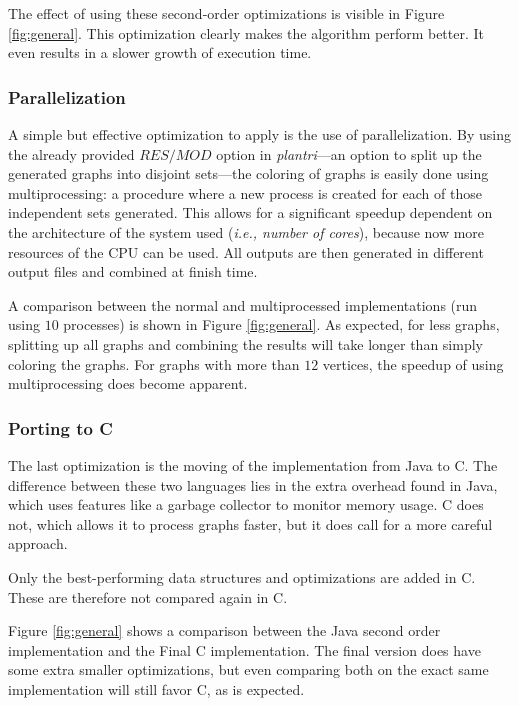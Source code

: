 \documentclass{article}
\begin{document}
The effect of using these second-order optimizations is visible in Figure \ref{fig:general}. This optimization clearly makes the algorithm perform better. It even results in a slower growth of execution time.

\subsubsection{Parallelization}

A simple but effective optimization to apply is the use of parallelization. By using the already provided $RES/MOD$ option in \textit{plantri}---an option to split up the generated graphs into disjoint sets---the coloring of graphs is easily done using multiprocessing: a procedure where a new process is created for each of those independent sets generated. This allows for a significant speedup dependent on the architecture of the system used (\textit{i.e., number of cores}), because now more resources of the CPU can be used.
All outputs are then generated in different output files and combined at finish time.

A comparison between the normal and multiprocessed implementations (run using $10$ processes) is shown in Figure \ref{fig:general}. As expected, for less graphs, splitting up all graphs and combining the results will take longer than simply coloring the graphs. For graphs with more than $12$ vertices, the speedup of using multiprocessing does become apparent. 

\subsubsection{Porting to C}

The last optimization is the moving of the implementation from Java to C. The difference between these two languages lies in the extra overhead found in Java, which uses features like a garbage collector to monitor memory usage. C does not, which allows it to process graphs faster, but it does call for a more careful approach.

Only the best-performing data structures and optimizations are added in C. These are therefore not compared again in C.

Figure \ref{fig:general} shows a comparison between the Java second order implementation and the Final C implementation. The final version does have some extra smaller optimizations, but even comparing both on the exact same implementation will still favor C, as is expected.
\end{document}
